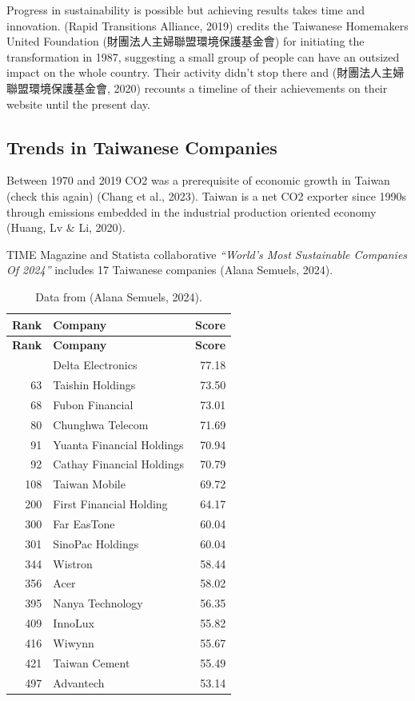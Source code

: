 \documentclass[
  letterpaper,
  DIV=11,
  numbers=noendperiod]{scrartcl}
\begin{document}
Progress in sustainability is possible but achieving results takes time
and innovation. (Rapid Transitions Alliance, 2019) credits the Taiwanese
Homemakers United Foundation (財團法人主婦聯盟環境保護基金會) for
initiating the transformation in 1987, suggesting a small group of
people can have an outsized impact on the whole country. Their activity
didn't stop there and (財團法人主婦聯盟環境保護基金會, 2020) recounts a
timeline of their achievements on their website until the present day.

\subsection{Trends in Taiwanese
Companies}\label{trends-in-taiwanese-companies}

Between 1970 and 2019 CO2 was a prerequisite of economic growth in
Taiwan (check this again) (Chang et al., 2023). Taiwan is a net CO2
exporter since 1990s through emissions embedded in the industrial
production oriented economy (Huang, Lv \& Li, 2020).

TIME Magazine and Statista collaborative \emph{``World's Most
Sustainable Companies Of 2024''} includes 17 Taiwanese companies (Alana
Semuels, 2024).

\begin{longtable}[]{@{}rlr@{}}
\caption{Data from (Alana Semuels, 2024).}\tabularnewline
\toprule\noalign{}
\textbf{Rank} & \textbf{Company} & \textbf{Score} \\
\midrule\noalign{}
\endfirsthead
\toprule\noalign{}
\textbf{Rank} & \textbf{Company} & \textbf{Score} \\
\midrule\noalign{}
\endhead
\bottomrule\noalign{}
\endlastfoot
24 & Delta Electronics & 77.18 \\
63 & Taishin Holdings & 73.50 \\
68 & Fubon Financial & 73.01 \\
80 & Chunghwa Telecom & 71.69 \\
91 & Yuanta Financial Holdings & 70.94 \\
92 & Cathay Financial Holdings & 70.79 \\
108 & Taiwan Mobile & 69.72 \\
200 & First Financial Holding & 64.17 \\
300 & Far EasTone & 60.04 \\
301 & SinoPac Holdings & 60.04 \\
344 & Wistron & 58.44 \\
356 & Acer & 58.02 \\
395 & Nanya Technology & 56.35 \\
409 & InnoLux & 55.82 \\
416 & Wiwynn & 55.67 \\
421 & Taiwan Cement & 55.49 \\
497 & Advantech & 53.14 \\
\end{longtable}
\end{document}
